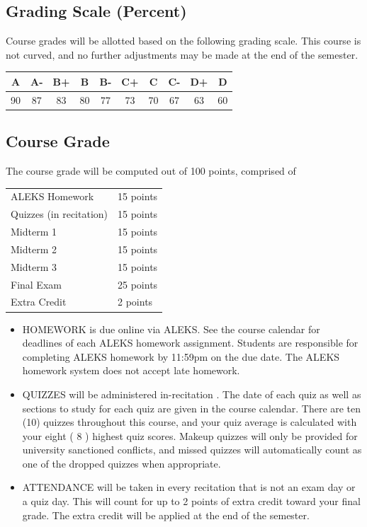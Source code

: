 \documentclass{ximera}
\begin{document}
\subsection*{Grading Scale (Percent)}
Course grades will be allotted based on the following grading scale. This course is not curved, and no further adjustments may be made at the end of the semester.

\begin{center}
\begin{tabular}{c|c|c|c|c|c|c|c|c|c}
A & A- & B+ & B & B- & C+ & C & C- & D+ & D \\
\hline
90 & 87 & 83 & 80 & 77 & 73 & 70 & 67 & 63 & 60 \\
\hline
\end{tabular}
\end{center}

\subsection*{Course Grade}
The course grade will be computed out of 100 points, comprised of

\begin{center}
\begin{tabular}{l|l}
ALEKS Homework & 15 points \\
Quizzes (in recitation) & 15 points \\
Midterm 1 & 15 points \\
Midterm 2 & 15 points \\
Midterm 3 & 15 points \\
Final Exam & 25 points \\
Extra Credit & 2 points \\
\end{tabular}
\end{center}

\begin{itemize}
  \item HOMEWORK is due online via ALEKS. See the course calendar for deadlines of each ALEKS homework assignment. Students are responsible for completing ALEKS homework by 11:59pm on the due date. The ALEKS homework system does not accept late homework.
  \item QUIZZES will be administered in-recitation . The date of each quiz as well as sections to study for each quiz are given in the course calendar. There are ten (10) quizzes throughout this course, and your quiz average is calculated with your eight ( 8 ) highest quiz scores. Makeup quizzes will only be provided for university sanctioned conflicts, and missed quizzes will automatically count as one of the dropped quizzes when appropriate.
  \item ATTENDANCE will be taken in every recitation that is not an exam day or a quiz day. This will count for up to 2 points of extra credit toward your final grade. The extra credit will be applied at the end of the semester.
\end{itemize}
\end{document}
